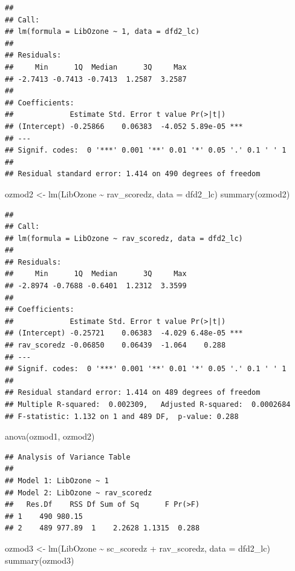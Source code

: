 \documentclass[
]{article}
\newenvironment{Shaded}{\begin{snugshade}}{\end{snugshade}}
\newcommand{\AttributeTok}[1]{\textcolor[rgb]{0.77,0.63,0.00}{#1}}
\newcommand{\FunctionTok}[1]{\textcolor[rgb]{0.00,0.00,0.00}{#1}}
\newcommand{\NormalTok}[1]{#1}
\newcommand{\OtherTok}[1]{\textcolor[rgb]{0.56,0.35,0.01}{#1}}
\newcommand{\SpecialCharTok}[1]{\textcolor[rgb]{0.00,0.00,0.00}{#1}}
\begin{document}
\begin{verbatim}
## 
## Call:
## lm(formula = LibOzone ~ 1, data = dfd2_lc)
## 
## Residuals:
##     Min      1Q  Median      3Q     Max 
## -2.7413 -0.7413 -0.7413  1.2587  3.2587 
## 
## Coefficients:
##             Estimate Std. Error t value Pr(>|t|)    
## (Intercept) -0.25866    0.06383  -4.052 5.89e-05 ***
## ---
## Signif. codes:  0 '***' 0.001 '**' 0.01 '*' 0.05 '.' 0.1 ' ' 1
## 
## Residual standard error: 1.414 on 490 degrees of freedom
\end{verbatim}

\begin{Shaded}
\begin{Highlighting}[]
\NormalTok{ozmod2 }\OtherTok{\textless{}{-}} \FunctionTok{lm}\NormalTok{(LibOzone }\SpecialCharTok{\textasciitilde{}}\NormalTok{ rav\_scoredz, }\AttributeTok{data =}\NormalTok{ dfd2\_lc)}
\FunctionTok{summary}\NormalTok{(ozmod2)}
\end{Highlighting}
\end{Shaded}

\begin{verbatim}
## 
## Call:
## lm(formula = LibOzone ~ rav_scoredz, data = dfd2_lc)
## 
## Residuals:
##     Min      1Q  Median      3Q     Max 
## -2.8974 -0.7688 -0.6401  1.2312  3.3599 
## 
## Coefficients:
##             Estimate Std. Error t value Pr(>|t|)    
## (Intercept) -0.25721    0.06383  -4.029 6.48e-05 ***
## rav_scoredz -0.06850    0.06439  -1.064    0.288    
## ---
## Signif. codes:  0 '***' 0.001 '**' 0.01 '*' 0.05 '.' 0.1 ' ' 1
## 
## Residual standard error: 1.414 on 489 degrees of freedom
## Multiple R-squared:  0.002309,   Adjusted R-squared:  0.0002684 
## F-statistic: 1.132 on 1 and 489 DF,  p-value: 0.288
\end{verbatim}

\begin{Shaded}
\begin{Highlighting}[]
\FunctionTok{anova}\NormalTok{(ozmod1, ozmod2)}
\end{Highlighting}
\end{Shaded}

\begin{verbatim}
## Analysis of Variance Table
## 
## Model 1: LibOzone ~ 1
## Model 2: LibOzone ~ rav_scoredz
##   Res.Df    RSS Df Sum of Sq      F Pr(>F)
## 1    490 980.15                           
## 2    489 977.89  1    2.2628 1.1315  0.288
\end{verbatim}

\begin{Shaded}
\begin{Highlighting}[]
\NormalTok{ozmod3 }\OtherTok{\textless{}{-}} \FunctionTok{lm}\NormalTok{(LibOzone }\SpecialCharTok{\textasciitilde{}}\NormalTok{ sc\_scoredz }\SpecialCharTok{+}\NormalTok{ rav\_scoredz, }\AttributeTok{data =}\NormalTok{ dfd2\_lc)}
\FunctionTok{summary}\NormalTok{(ozmod3)}
\end{Highlighting}
\end{Shaded}
\end{document}
